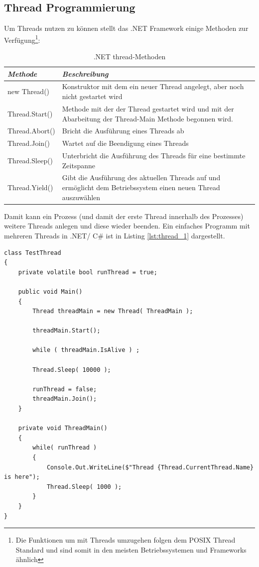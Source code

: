\subsection{Thread Programmierung}
Um Threads nutzen zu können stellt das .NET Framework einige Methoden zur Verfügung\parencite{ms_threading}\footnote{Die Funktionen um mit Threads umzugehen folgen dem POSIX Thread Standard und sind somit in den meisten Betriebssystemen und Frameworks ähnlich\parencite{butenhof1997} }:
\begin{table}[]
	\centering
	\label{Ttab:thread-methoden}
	\begin{tabular}{| l | p{10cm} |}
		\hline
		\textit{\textbf{Methode}} & \textit{\textbf{Beschreibung}}  \\
		\hline
		new Thread()                                         &    Konstruktor mit dem ein neuer Thread angelegt, aber noch nicht gestartet wird\\
		\hline
		Thread.Start()                                        &    Methode mit der der Thread gestartet wird und mit der Abarbeitung der Thread-Main Methode begonnen wird.\\
		\hline
		Thread.Abort()                                        &   Bricht die Ausführung eines Threads ab\\
		\hline
		Thread.Join()										 & Wartet auf die Beendigung eines Threads\\
		\hline
		Thread.Sleep()										& Unterbricht die Ausführung des Threads für eine bestimmte Zeitspanne\\
		\hline
		Thread.Yield()										& Gibt die Ausführung des aktuellen Threads auf und ermöglicht dem Betriebssystem einen neuen Thread auszuwählen\parencite{ms_threading_yield}\\
		\hline
	\end{tabular}
	\caption{.NET thread-Methoden}
\end{table}
Damit kann ein Prozess (und damit der erste Thread innerhalb des Prozesses) weitere Threads anlegen und diese wieder beenden. Ein einfaches Programm mit mehreren Threads in .NET/ C\# ist in Listing \ref{lst:thread_1} dargestellt.
\begin{lstlisting}[caption={Thread Hello World},label={lst:thread_1},captionpos=b]
class TestThread
{
	private volatile bool runThread = true;
	
	public void Main()
	{
		Thread threadMain = new Thread( ThreadMain );

		threadMain.Start();

		while ( threadMain.IsAlive ) ;

		Thread.Sleep( 10000 );

		runThread = false;
		threadMain.Join();
	}
	
	private void ThreadMain()
	{
		while( runThread )
		{
			Console.Out.WriteLine($"Thread {Thread.CurrentThread.Name} is here");
			Thread.Sleep( 1000 );
		}
	}
}
\end{lstlisting}
